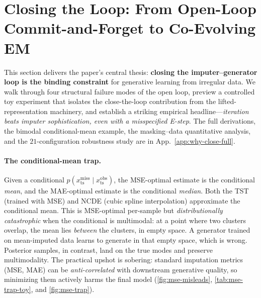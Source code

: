 \documentclass{article}
\theoremstyle{plain}
\theoremstyle{definition}
\theoremstyle{remark}
\newcommand{\xts}{x_{\mathrm{ts}}}
\begin{document}
\vspace{-2mm}
\section{Closing the Loop: From Open-Loop Commit-and-Forget to Co-Evolving EM}
\label{sec:why-close}
\vspace{-1mm}

This section delivers the paper's central thesis: \textbf{closing the imputer--generator loop is the binding constraint} for generative learning from irregular data. We walk through four structural failure modes of the open loop, preview a controlled toy experiment that isolates the close-the-loop contribution from the lifted-representation machinery, and establish a striking empirical headline---\emph{iteration beats imputer sophistication, even with a misspecified E-step}. The full derivations, the bimodal conditional-mean example, the masking--data quantitative analysis, and the $21$-configuration robustness study are in App.~\ref{app:why-close-full}.

\paragraph{The conditional-mean trap.}
Given a conditional $p(\xts^{\mathrm{miss}} \mid \xts^{\mathrm{obs}})$, the MSE-optimal estimate is the conditional \emph{mean}, and the MAE-optimal estimate is the conditional \emph{median}. Both the TST (trained with MSE) and NCDE (cubic spline interpolation) approximate the conditional mean. This is MSE-optimal per-sample but \emph{distributionally catastrophic} when the conditional is multimodal: at a point where two clusters overlap, the mean lies \emph{between} the clusters, in empty space. A generator trained on mean-imputed data learns to generate in that empty space, which is wrong. Posterior samples, in contrast, land on the true modes and preserve multimodality. The practical upshot is sobering: standard imputation metrics (MSE, MAE) can be \emph{anti-correlated} with downstream generative quality, so minimizing them actively harms the final model (\cref{fig:mse-misleads}, \cref{tab:mse-trap-toy}, and \cref{fig:mse-trap}).
\end{document}

